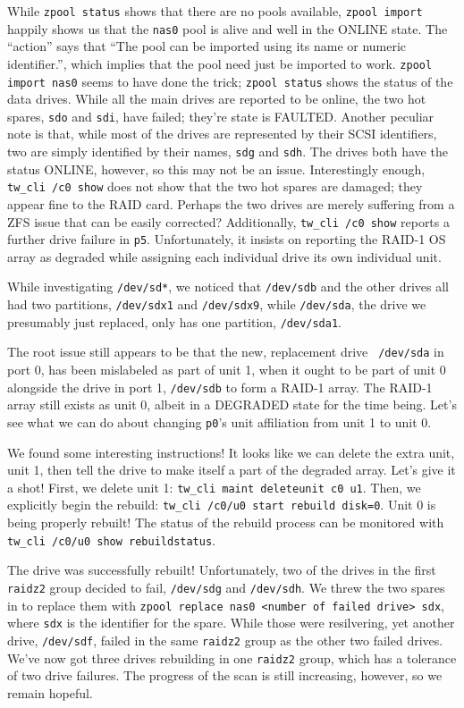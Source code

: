 \documentclass[12pt]{article}
\begin{document}
\qq While {\tt zpool status} shows that there are no pools available, {\tt zpool
  import} happily shows us that the {\tt nas0} pool is alive and well in the
ONLINE state. The ``action'' says that ``The pool can be imported using its name
or numeric identifier.'', which implies that the pool need just be imported to
work. {\tt zpool import nas0} seems to have done the trick; {\tt zpool status}
shows the status of the data drives. While all the main drives are reported to
be online, the two hot spares, {\tt sdo} and {\tt sdi}, have failed; they're
state is FAULTED. Another peculiar note is that, while most of the drives are
represented by their SCSI identifiers, two are simply identified by their names,
{\tt sdg} and {\tt sdh}. The drives both have the status ONLINE, however, so
this may not be an issue. Interestingly enough, {\tt tw\_cli /c0 show} does not
show that the two hot spares are damaged; they appear fine to the RAID
card. Perhaps the two drives are merely suffering from a ZFS issue that can be
easily corrected? Additionally, {\tt tw\_cli /c0 show} reports a further drive
failure in {\tt p5}. Unfortunately, it insists on reporting the RAID-1 OS array
as degraded while assigning each individual drive its own individual unit. 

\qq While investigating {\tt /dev/sd*}, we noticed that {\tt /dev/sdb} and the
other drives all had two partitions, {\tt /dev/sdx1} and {\tt /dev/sdx9}, while
{\tt /dev/sda}, the drive we presumably just replaced, only has one partition,
{\tt /dev/sda1}. 

\qq The root issue still appears to be that the new, replacement drive {\tt
  /dev/sda} in port 0, has been mislabeled as part of unit 1, when it ought to
be part of unit 0 alongside the drive in port 1, {\tt /dev/sdb} to form a RAID-1
array. The RAID-1 array still exists as unit 0, albeit in a DEGRADED state for
the time being. Let's see what we can do about changing {\tt p0}'s unit
affiliation from unit 1 to unit 0. 

\qq We found some interesting instructions! It looks like we can delete the
extra unit, unit 1, then tell the drive to make itself a part of the degraded
array. Let's give it a shot! First, we delete unit 1: {\tt tw\_cli maint
  deleteunit c0 u1}. Then, we explicitly begin the rebuild: {\tt tw\_cli /c0/u0
  start rebuild disk=0}. Unit 0 is being properly rebuilt! The status of the
rebuild process can be monitored with {\tt tw\_cli /c0/u0 show rebuildstatus}. 

\qq The drive was successfully rebuilt! Unfortunately, two of the drives in the
first {\tt raidz2} group decided to fail, {\tt /dev/sdg} and {\tt /dev/sdh}. We
threw the two spares in to replace them with {\tt zpool replace nas0 <number of
  failed drive> sdx}, where {\tt sdx} is the identifier for the spare. While
those were resilvering, yet another drive, {\tt /dev/sdf}, failed in the same
{\tt raidz2} group as the other two failed drives. We've now got three drives
rebuilding in one {\tt raidz2} group, which has a tolerance of two drive
failures. The progress of the scan is still increasing, however, so we remain
hopeful. 
\end{document}
